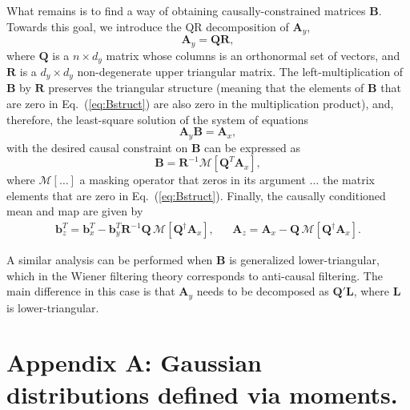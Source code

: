 \documentclass[a4paper,notitlepage]{article}
\renewcommand{\b}[1]{\mathbf{#1}}
\renewcommand{\eqref}[1]{Eq.~(\ref{#1})}
\begin{document}
What remains is to find a way of obtaining causally-constrained matrices $\b{B}$. Towards this goal, we introduce the QR decomposition of $\b{A}_y$,
\begin{equation}
\b{A}_y = \b{Q}\b{R},
\end{equation} 
where $\b{Q}$ is a $n\times d_y$ matrix whose columns is an orthonormal set of vectors, and $\b{R}$ is a $d_y\times d_y$ non-degenerate upper triangular matrix. The left-multiplication of $\b{B}$ by $\b{R}$ preserves the triangular structure (meaning that the elements of $\b{B}$ that are zero in \eqref{eq:Bstruct} are also zero in the multiplication product), and, therefore, the least-square solution of the system of equations
\begin{equation}
\b{A}_y \b{B} = \b{A}_x,
\end{equation}
with the desired causal constraint on $\b{B}$ can be expressed as
\begin{equation}
\b{B}=\b{R}^{-1}\mathcal{M}\left[\b{Q}^T\b{A}_x\right],
\end{equation}
where $\mathcal{M}[\ldots]$ a masking operator that zeros in its argument $\ldots$ the matrix elements that are zero in \eqref{eq:Bstruct}.
Finally, the causally conditioned mean and map are given by
\begin{align}
\b{b}_z^T=\b{b}_{x}^T-\b{b}_y^T \b{R}^{-1}\b{Q}\, \mathcal{M}\left[\b{Q}^\dagger\b{A}_x\right],&&
\b{A}_z =\b{A}_x - \b{Q}\, \mathcal{M}\left[\b{Q}^\dagger\b{A}_x\right].
\end{align}

A similar analysis can be performed when $\b{B}$ is generalized lower-triangular, which in the Wiener filtering theory corresponds to anti-causal filtering. The main difference in this case is that $\b{A}_y$ needs to be decomposed as $\b{Q}'\b{L}$, where $\b{L}$ is lower-triangular. 

\appendix

\setcounter{equation}{0}
\setcounter{figure}{0}
\renewcommand{\theequation}{A\arabic{equation}}
\renewcommand{\thefigure}{A\arabic{figure}}

\section*{Appendix A: Gaussian distributions defined via moments.}\label{sec:refFacts}
\end{document}
